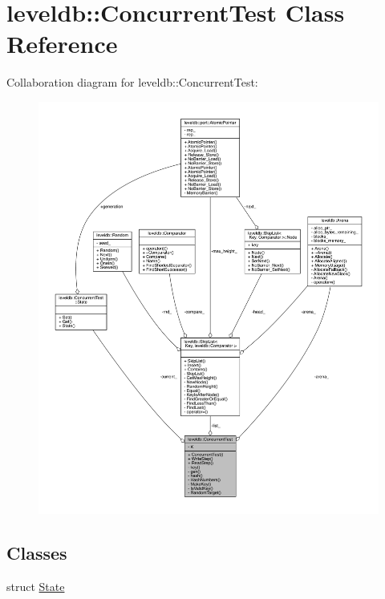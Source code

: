 \hypertarget{classleveldb_1_1_concurrent_test}{}\section{leveldb\+:\+:Concurrent\+Test Class Reference}
\label{classleveldb_1_1_concurrent_test}


Collaboration diagram for leveldb\+:\+:Concurrent\+Test\+:\nopagebreak
\begin{figure}[H]
\begin{center}
\leavevmode
\includegraphics[width=350pt]{classleveldb_1_1_concurrent_test__coll__graph}
\end{center}
\end{figure}
\subsection*{Classes}
\begin{DoxyCompactItemize}
\item 
struct \hyperlink{structleveldb_1_1_concurrent_test_1_1_state}{State}
\end{DoxyCompactItemize}
